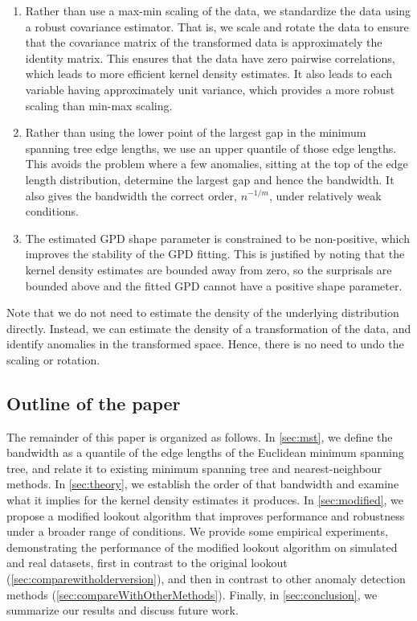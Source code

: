 \begin{enumerate}
  \item Rather than use a max-min scaling of the data, we standardize the data using a robust covariance estimator. That is, we scale and rotate the data to ensure that the covariance matrix of the transformed data is approximately the identity matrix. This ensures that the data have zero pairwise correlations, which leads to more efficient kernel density estimates. It also leads to each variable having approximately unit variance, which provides a more robust scaling than min-max scaling.
  \item Rather than using the lower point of the largest gap in the minimum spanning tree edge lengths, we use an upper quantile of those edge lengths. This avoids the problem where a few anomalies, sitting at the top of the edge length distribution, determine the largest gap and hence the bandwidth. It also gives the bandwidth the correct order, $n^{-1/m}$, under relatively weak conditions.
  \item The estimated GPD shape parameter is constrained to be non-positive, which improves the stability of the GPD fitting. This is justified by noting that the kernel density estimates are bounded away from zero, so the surprisals are bounded above and the fitted GPD cannot have a positive shape parameter.
\end{enumerate}

Note that we do not need to estimate the density of the underlying distribution directly. Instead, we can estimate the density of a transformation of the data, and identify anomalies in the transformed space. Hence, there is no need to undo the scaling or rotation.

\subsection{Outline of the paper}

The remainder of this paper is organized as follows. In \cref{sec:mst}, we define the bandwidth as a quantile of the edge lengths of the Euclidean minimum spanning tree, and relate it to existing minimum spanning tree and nearest-neighbour methods. In \cref{sec:theory}, we establish the order of that bandwidth and examine what it implies for the kernel density estimates it produces. In \cref{sec:modified}, we propose a modified lookout algorithm that improves performance and robustness under a broader range of conditions. We provide some empirical experiments, demonstrating the performance of the modified lookout algorithm on simulated and real datasets, first in contrast to the original lookout (\cref{sec:comparewitholderversion}), and then in contrast to other anomaly detection methods (\cref{sec:compareWithOtherMethods}). Finally, in \cref{sec:conclusion}, we summarize our results and discuss future work.
